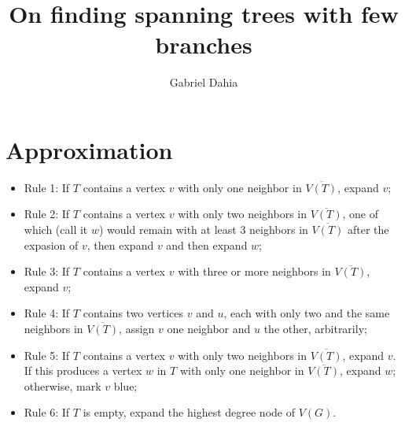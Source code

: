\documentclass[12pt]{article}
\title{On finding spanning trees with few branches}
\author{Gabriel Dahia\inst{1}}
\begin{document}
 

\maketitle

\section{Approximation}

\begin{itemize}
  \item Rule 1: If $T$ contains a vertex $v$ with only one neighbor in $\overline{V(T)}$, expand $v$;
  \item Rule 2: If $T$ contains a vertex $v$ with only two neighbors in $\overline{V(T)}$, one of which (call it $w$) would remain with at least 3 neighbors in $\overline{V(T)}$ after the expasion of $v$, then expand $v$ and then expand $w$;
  \item Rule 3: If $T$ contains a vertex $v$ with three or more neighbors in $\overline{V(T)}$, expand $v$;
  \item Rule 4: If $T$ contains two vertices $v$ and $u$, each with only two and the same neighbors in $\overline{V(T)}$, assign $v$ one neighbor and $u$ the other, arbitrarily;
  \item Rule 5: If $T$ contains a vertex $v$ with only two neighbors in $\overline{V(T)}$, expand $v$.
    If this produces a vertex $w$ in $T$ with only one neighbor in $\overline{V(T)}$, expand $w$; otherwise, mark $v$ blue;
  \item Rule 6: If $T$ is empty, expand the highest degree node of $V(G)$.
\end{itemize}
\end{document}
